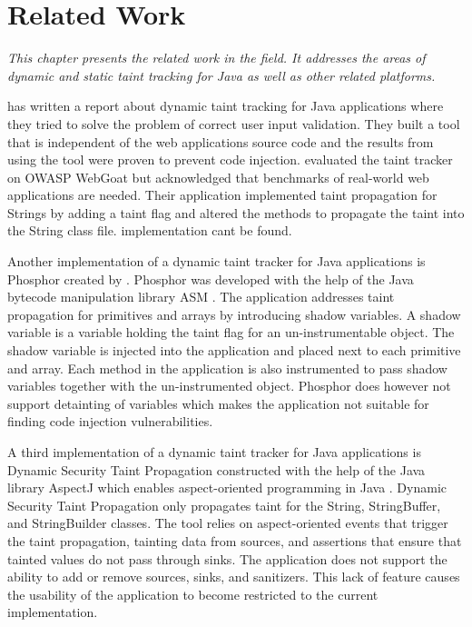 \chapter{Related Work}
\label{RW}
\textit{This chapter presents the related work in the field. It addresses the areas of dynamic and static taint tracking for Java as well as other related platforms.}

\textcite{Haldar} has written a report about dynamic taint tracking for Java applications where they tried to solve the problem of correct user input validation. They built a tool that is independent of the web applications source code and the results from using the tool were proven to prevent code injection. \textcite{Haldar} evaluated the taint tracker on OWASP WebGoat \parencite{webgoat} but acknowledged that benchmarks of real-world web applications are needed. Their application implemented taint propagation for Strings by adding a taint flag and altered the methods to propagate the taint into the String class file. \textcite{Haldar} implementation cant be found.

Another implementation of a dynamic taint tracker for Java applications is Phosphor \parencite{phosphor} created by \textcite{BellJ.2014PIdd}. Phosphor was developed with the help of the Java bytecode manipulation library ASM \parencite{asm}. The application addresses taint propagation for primitives and arrays by introducing shadow variables. A shadow variable is a variable holding the taint flag for an un-instrumentable object. The shadow variable is injected into the application and placed next to each primitive and array. Each method in the application is also instrumented to pass shadow variables together with the un-instrumented object. Phosphor does however not support detainting of variables \parencite{BellJ.2014PIdd} which makes the application not suitable for finding code injection vulnerabilities. 

A third implementation of a dynamic taint tracker for Java applications is Dynamic Security Taint Propagation \parencite{securityTaint} constructed with the help of the Java library AspectJ which enables aspect-oriented programming in Java \parencite{aspectj}. Dynamic Security Taint Propagation only propagates taint for the String, StringBuffer, and StringBuilder classes. The tool relies on aspect-oriented events that trigger the taint propagation, tainting data from sources, and assertions that ensure that tainted values do not pass through sinks. The application does not support the ability to add or remove sources, sinks, and sanitizers. This lack of feature causes the usability of the application to become restricted to the current implementation.

